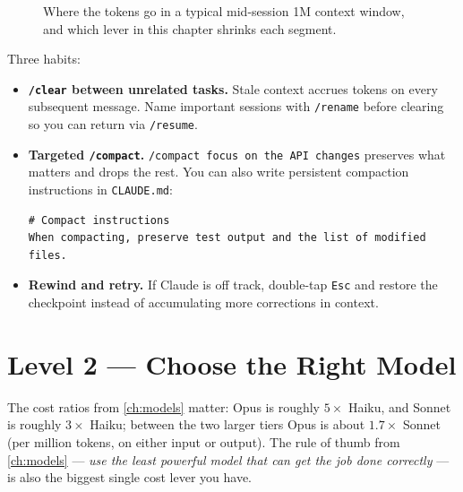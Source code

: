\begin{figure}[ht]
\caption{Where the tokens go in a typical mid-session 1M context
window, and which lever in this chapter shrinks each segment.}
\label{fig:context-composition}
\end{figure}

Three habits:

\begin{itemize}
  \item \textbf{\texttt{/clear} between unrelated tasks.} Stale context
        accrues tokens on every subsequent message.
        Name important sessions with \texttt{/rename} before clearing so
        you can return via \texttt{/resume}.
  \item \textbf{Targeted \texttt{/compact}.} \texttt{/compact focus on
        the API changes} preserves what matters and drops the rest. You
        can also write persistent compaction instructions in
        \texttt{CLAUDE.md}:
\begin{verbatim}
# Compact instructions
When compacting, preserve test output and the list of modified files.
\end{verbatim}
  \item \textbf{Rewind and retry.} If Claude is off track, double-tap
        \texttt{Esc} and restore the checkpoint instead of accumulating
        more corrections in context.
\end{itemize}

\section{Level 2 — Choose the Right Model}
\label{sec:cost-model}


The cost ratios from \cref{ch:models} matter: Opus is roughly $5\times$
Haiku, and Sonnet is roughly $3\times$ Haiku; between the two larger
tiers Opus is about $1.7\times$ Sonnet (per million tokens, on either
input or output). The rule of thumb from \cref{ch:models} —
\emph{use the least powerful model that can get the job done correctly} —
is also the biggest single cost lever you have.

